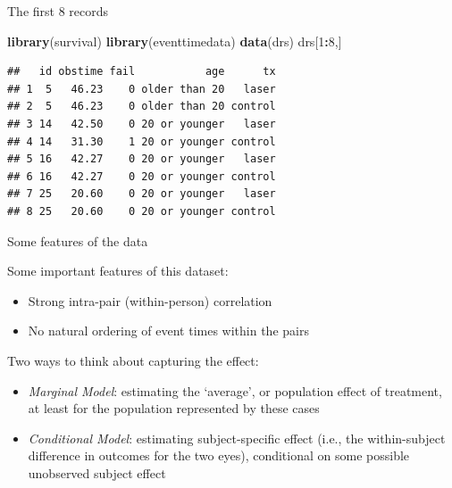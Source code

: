 \documentclass[ignorenonframetext,]{beamer}
\newenvironment{Shaded}{\begin{snugshade}}{\end{snugshade}}
\newcommand{\DecValTok}[1]{\textcolor[rgb]{0.00,0.00,0.81}{#1}}
\newcommand{\KeywordTok}[1]{\textcolor[rgb]{0.13,0.29,0.53}{\textbf{#1}}}
\newcommand{\NormalTok}[1]{#1}
\newcommand{\OperatorTok}[1]{\textcolor[rgb]{0.81,0.36,0.00}{\textbf{#1}}}
\begin{document}
\begin{frame}[fragile]{%
\protect\hypertarget{the-first-8-records}{%
The first 8 records}}

\footnotesize

\begin{Shaded}
\begin{Highlighting}[]
\KeywordTok{library}\NormalTok{(survival)}
\KeywordTok{library}\NormalTok{(eventtimedata)}
\KeywordTok{data}\NormalTok{(drs)}
\NormalTok{drs[}\DecValTok{1}\OperatorTok{:}\DecValTok{8}\NormalTok{,]}
\end{Highlighting}
\end{Shaded}

\begin{verbatim}
##   id obstime fail           age      tx
## 1  5   46.23    0 older than 20   laser
## 2  5   46.23    0 older than 20 control
## 3 14   42.50    0 20 or younger   laser
## 4 14   31.30    1 20 or younger control
## 5 16   42.27    0 20 or younger   laser
## 6 16   42.27    0 20 or younger control
## 7 25   20.60    0 20 or younger   laser
## 8 25   20.60    0 20 or younger control
\end{verbatim}

\end{frame}

\begin{frame}{%
\protect\hypertarget{some-features-of-the-data}{%
Some features of the data}}

Some important features of this dataset:

\begin{itemize}
\item
  Strong intra-pair (within-person) correlation
\item
  No natural ordering of event times within the pairs
\end{itemize}

Two ways to think about capturing the effect:

\begin{itemize}
\item
  \emph{Marginal Model}: estimating the `average’, or population effect
  of treatment, at least for the population represented by these cases
\item
  \emph{Conditional Model}: estimating subject-specific effect (i.e.,
  the within-subject difference in outcomes for the two eyes),
  conditional on some possible unobserved subject effect
\end{itemize}

\end{frame}
\end{document}
